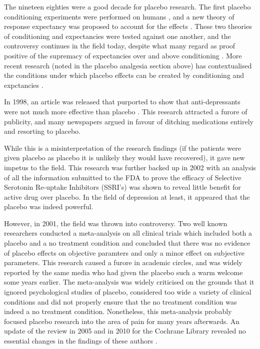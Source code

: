 The nineteen eighties were a good decade for placebo research. The first placebo conditioning experiments were performed on humans \cite{Voudouris1985}, and a new theory of response expectancy was proposed to account for the effects \cite{Kirsch1985}. These two theories of conditioning and expectancies were tested against one another, and the controversy continues in the field today, despite what many regard as proof positive of the supremacy of expectancies over and above conditioning \cite{Montgomery1997}. More recent research (noted in the placebo analgesia section above) has contextualised the conditions under which placebo effects can be created by conditioning and expctancies \cite{Benedetti2003a}. 

In 1998, an article was released that purported to show that anti-depressants were not much more effective than placebo \cite{Kirsch1998}. This research attracted a furore of publicity, and many newspapers argued in favour of ditching medications entirely and resorting to placebo. 

While this is a misinterpretation of the research findings (if the patients were given placebo as placebo it is unlikely they would have recovered), it gave new impetus to the field. This research was further backed up in 2002 \cite{Kirsch2002a}  with an analysis of all the information submitted to the FDA to prove the efficacy of Selective Serotonin Re-uptake Inhibitors (SSRI's) was shown to reveal little benefit for active drug over placebo. In the field of depression at least, it appeared that the placebo was indeed powerful. 

However, in 2001, the field was thrown into controversy. Two well known researchers conducted a meta-analysis on all clinical trials which included both a placebo and a no treatment condition \cite{hrobjartsson2001placebo}  and concluded that there was no evidence of placebo effects on objective paramters and only a minor effect on subjective parameters. This research caused a furore in academic circles, and was widely reported by the same media who had given the placebo such a warm welcome some years earlier. The meta-analysis was widely criticised \cite{Evans2003,Kirsch2001, Wickramasekera2001,Greene2001}  on the grounds that it ignored psychological studies of placebo, considered too wide a variety of clinical conditions and did not properly ensure that the no treatment condition was indeed a no treatment condition. Nonetheless, this meta-analysis probably focused placebo research into the area of pain for many years afterwards. An update of the review in 2005 and in 2010 for the Cochrane Library revealed no essential changes in the findings of these authors \cite{Hrobjartsson2004}. 

